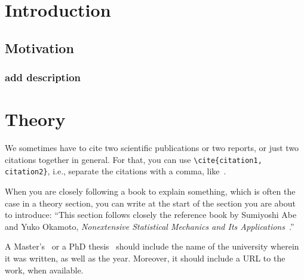 \documentclass[a4paper,11pt,masters,en,listoffigures,listoftables]{NMBU}
\title{}
\author{}
\begin{document}


\startthesis %

\section{Introduction}

\subsection{Motivation}

\subsubsection{add description}

\clearpage %
\section{Theory}

We sometimes have to cite two scientific publications or two reports, or just two citations together in general. For that, you can use \verb|\cite{citation1, citation2}|, i.e., separate the citations with a comma, like~\cite{Beck2000application, Beck2005timeseries, Milano2018}.

When you are closely following a book to explain something, which is often the case in a theory section, you can write at the start of the section you are about to introduce: ``This section follows closely the reference book by Sumiyoshi Abe and Yuko Okamoto, \emph{Nonextensive Statistical Mechanics and Its Applications}~\cite{Abe2001nonextensive}.''

A Master's~\cite{LastName2045norwegian} or a PhD thesis~\cite{Temult2038binding} should include the name of the university wherein it was written, as well as the year. Moreover, it should include a URL to the work, when available.
\end{document}
